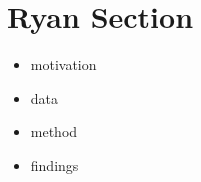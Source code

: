\section{Ryan Section}
\begin{itemize}
\item motivation
\item data
\item method
\item findings
\end{itemize}